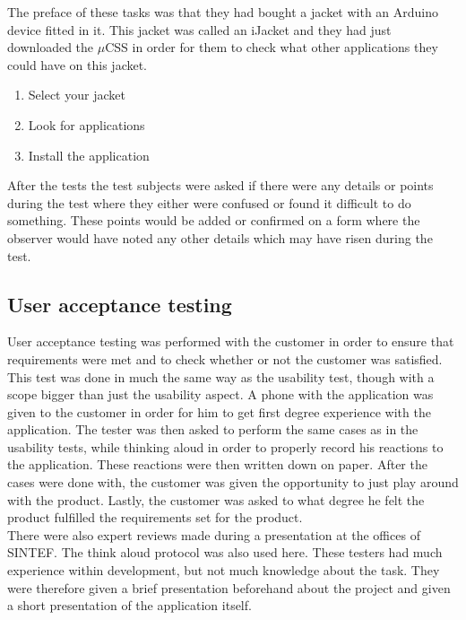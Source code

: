 			The preface of these tasks was that they had bought a jacket with an Arduino device fitted in it. This jacket was called an iJacket and they had just downloaded the $\mu$CSS in order for them to check what other applications they could have on this jacket.

			\vspace{6 mm}
			\begin{enumerate}
			 \item Select your jacket
			 \item Look for applications
			 \item Install the application
			\end{enumerate}
			\vspace{6 mm}

			After the tests the test subjects were asked if there were any details or points during the test where they either were confused or found it difficult to do something. These points would be added or confirmed on a form where the observer would have noted any other details which may have risen during the test.

		\subsection{User acceptance testing}
		User acceptance testing was performed with the customer in order to ensure that requirements were met and to check whether or not the customer was satisfied. This test was done in much the same way as the usability test, though with a scope bigger than just the usability aspect. A phone with the application was given to the customer in order for him to get first degree experience with the application. The tester was then asked to perform the same cases as in the usability tests, while thinking aloud in order to properly record his reactions to the application. These reactions were then written down on paper. After the cases were done with, the customer was given the opportunity to just play around with the product. Lastly, the customer was asked to what degree he felt the product fulfilled the requirements set for the product.\\
		\newline
		There were also expert reviews made during a presentation at the offices of SINTEF. The think aloud protocol was also used here. These testers had much experience within development, but not much knowledge about the task. They were therefore given a brief presentation beforehand about the project and given a short presentation of the application itself.\\



